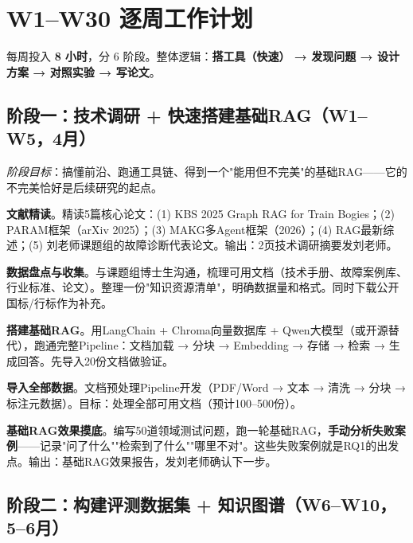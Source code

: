 \documentclass[a4paper, 11pt]{ctexart}
\begin{document}
\section{W1--W30 逐周工作计划}

每周投入 \textbf{8 小时}，分 6 阶段。整体逻辑：\textbf{搭工具（快速） → 发现问题 → 设计方案 → 对照实验 → 写论文}。

\subsection{阶段一：技术调研 + 快速搭建基础RAG（W1--W5，4月）}

\noindent\textit{阶段目标}：搞懂前沿、跑通工具链、得到一个"能用但不完美"的基础RAG——它的不完美恰好是后续研究的起点。

\begin{description}[style=nextline, leftmargin=1.2cm, labelwidth=1cm, font=\bfseries\color{tsinghua}]
\item[W1] \textbf{文献精读}。精读5篇核心论文：(1) KBS 2025 Graph RAG for Train Bogies；(2) PARAM框架（arXiv 2025）；(3) MAKG多Agent框架（2026）；(4) RAG最新综述；(5) 刘老师课题组的故障诊断代表论文。输出：2页技术调研摘要发刘老师。
\item[W2] \textbf{数据盘点与收集}。与课题组博士生沟通，梳理可用文档（技术手册、故障案例库、行业标准、论文）。整理一份"知识资源清单"，明确数据量和格式。同时下载公开国标/行标作为补充。
\item[W3] \textbf{搭建基础RAG}。用LangChain + Chroma向量数据库 + Qwen大模型（或开源替代），跑通完整Pipeline：文档加载 → 分块 → Embedding → 存储 → 检索 → 生成回答。先导入20份文档做验证。
\item[W4] \textbf{导入全部数据}。文档预处理Pipeline开发（PDF/Word → 文本 → 清洗 → 分块 → 标注元数据）。目标：处理全部可用文档（预计100--500份）。
\item[W5] \textbf{基础RAG效果摸底}。编写50道领域测试问题，跑一轮基础RAG，\textbf{手动分析失败案例}——记录"问了什么""检索到了什么""哪里不对"。这些失败案例就是RQ1的出发点。输出：基础RAG效果报告，发刘老师确认下一步。
\end{description}

\subsection{阶段二：构建评测数据集 + 知识图谱（W6--W10，5--6月）}
\end{document}

